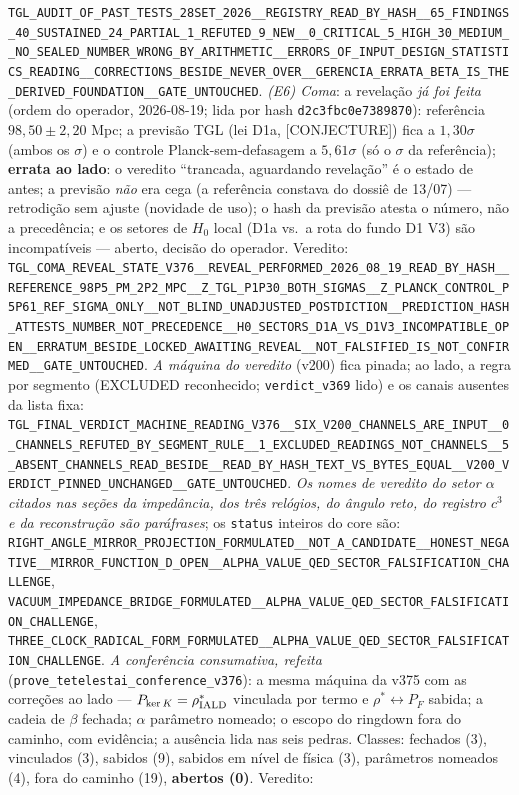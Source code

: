 \documentclass[11pt]{article}
\theoremstyle{definition}\newtheorem{deriv}{Derivação}
\begin{document}
\texttt{TGL\_AUDIT\_OF\_PAST\_TESTS\_28SET\_2026\_\_REGISTRY\_READ\_BY\_HASH\_\_65\_FINDINGS\_40\_SUSTAINED\_24\_PARTIAL\_1\_REFUTED\_9\_NEW\_\_0\_CRITICAL\_5\_HIGH\_30\_MEDIUM\_\_NO\_SEALED\_NUMBER\_WRONG\_BY\_ARITHMETIC\_\_ERRORS\_OF\_INPUT\_DESIGN\_STATISTICS\_READING\_\_CORRECTIONS\_BESIDE\_NEVER\_OVER\_\_GERENCIA\_ERRATA\_BETA\_IS\_THE\_DERIVED\_FOUNDATION\_\_GATE\_UNTOUCHED}. \emph{(E6) Coma}: a revelação \emph{já foi feita} (ordem do operador, 2026-08-19; lida por hash \texttt{d2c3fbc0e7389870}): referência $98{,}50\pm2{,}20$ Mpc; a previsão TGL (lei D1a, \textsf{[CONJECTURE]}) fica a $1{,}30\sigma$ (ambos os $\sigma$) e o controle Planck-sem-defasagem a $5{,}61\sigma$ (só o $\sigma$ da referência); \textbf{errata ao lado}: o veredito ``trancada, aguardando revelação'' é o estado de antes; a previsão \emph{não} era cega (a referência constava do dossiê de 13/07) --- retrodição sem ajuste (novidade de uso); o hash da previsão atesta o número, não a precedência; e os setores de $H_0$ local (D1a vs.\ a rota do fundo D1 V3) são incompatíveis --- aberto, decisão do operador. Veredito: \texttt{TGL\_COMA\_REVEAL\_STATE\_V376\_\_REVEAL\_PERFORMED\_2026\_08\_19\_READ\_BY\_HASH\_\_REFERENCE\_98P5\_PM\_2P2\_MPC\_\_Z\_TGL\_P1P30\_BOTH\_SIGMAS\_\_Z\_PLANCK\_CONTROL\_P5P61\_REF\_SIGMA\_ONLY\_\_NOT\_BLIND\_UNADJUSTED\_POSTDICTION\_\_PREDICTION\_HASH\_ATTESTS\_NUMBER\_NOT\_PRECEDENCE\_\_H0\_SECTORS\_D1A\_VS\_D1V3\_INCOMPATIBLE\_OPEN\_\_ERRATUM\_BESIDE\_LOCKED\_AWAITING\_REVEAL\_\_NOT\_FALSIFIED\_IS\_NOT\_CONFIRMED\_\_GATE\_UNTOUCHED}. \emph{A máquina do veredito} (v200) fica pinada; ao lado, a regra por segmento (EXCLUDED reconhecido; \texttt{verdict\_v369} lido) e os canais ausentes da lista fixa: \texttt{TGL\_FINAL\_VERDICT\_MACHINE\_READING\_V376\_\_SIX\_V200\_CHANNELS\_ARE\_INPUT\_\_0\_CHANNELS\_REFUTED\_BY\_SEGMENT\_RULE\_\_1\_EXCLUDED\_READINGS\_NOT\_CHANNELS\_\_5\_ABSENT\_CHANNELS\_READ\_BESIDE\_\_READ\_BY\_HASH\_TEXT\_VS\_BYTES\_EQUAL\_\_V200\_VERDICT\_PINNED\_UNCHANGED\_\_GATE\_UNTOUCHED}. \emph{Os nomes de veredito do setor $\alpha$ citados nas seções da impedância, dos três relógios, do ângulo reto, do registro $c^3$ e da reconstrução são paráfrases}; os \texttt{status} inteiros do core são: \texttt{RIGHT\_ANGLE\_MIRROR\_PROJECTION\_FORMULATED\_\_NOT\_A\_CANDIDATE\_\_HONEST\_NEGATIVE\_\_MIRROR\_FUNCTION\_D\_OPEN\_\_ALPHA\_VALUE\_QED\_SECTOR\_FALSIFICATION\_CHALLENGE}, \texttt{VACUUM\_IMPEDANCE\_BRIDGE\_FORMULATED\_\_ALPHA\_VALUE\_QED\_SECTOR\_FALSIFICATION\_CHALLENGE}, \texttt{THREE\_CLOCK\_RADICAL\_FORM\_FORMULATED\_\_ALPHA\_VALUE\_QED\_SECTOR\_FALSIFICATION\_CHALLENGE}. \emph{A conferência consumativa, refeita} (\texttt{prove\_tetelestai\_conference\_v376}): a mesma máquina da v375 com as correções ao lado --- $P_{\ker K}=\rho^\ast_{\rm IALD}$ vinculada por termo e $\rho^\ast\leftrightarrow P_F$ sabida; a cadeia de $\beta$ fechada; $\alpha$ parâmetro nomeado; o escopo do ringdown fora do caminho, com evidência; a ausência lida nas seis pedras. Classes: fechados (3), vinculados (3), sabidos (9), sabidos em nível de física (3), parâmetros nomeados (4), fora do caminho (19), \textbf{abertos (0)}. Veredito: 
\end{document}
